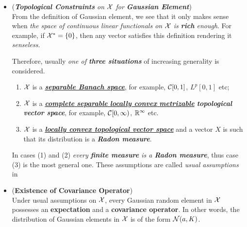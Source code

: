 \documentclass[11pt]{article}
\begin{document}
\begin{itemize}
\item \begin{remark} (\emph{\textbf{Topological Constraints} on ${\mathcal X}$ for \textbf{Gaussian Element}})  \citep{lifshits2012lectures}\\
From the definition of Gaussian element, we see that it only makes sense when \emph{the space of continuous linear functionals on ${\mathcal X}$ is \textbf{rich} enough}. For example, if ${\mathcal X}^*= \left\{0\right\}$, then any vector satisfies this definition rendering it \emph{senseless}. 

Therefore, usually \emph{one of \textbf{three situations}} of increasing generality is considered.
\begin{enumerate}
\item ${\mathcal X}$ is a \underline{\emph{\textbf{separable Banach space}}}, for example, ${\mathcal C}[0, 1]$, $L^p[0, 1]$ etc; 
\item ${\mathcal X}$ is a \emph{\underline{\textbf{complete} \textbf{separable} \textbf{locally convex} \textbf{metrizable}} \textbf{topological vector space}},
for example, ${\mathcal C}[0, \infty)$, ${\mathbb R}^{\infty}$ etc.
\item ${\mathcal X}$ is a \underline{\emph{\textbf{locally convex topological vector space}}} and a vector $X$ is such that its distribution is a \emph{\textbf{Radon measure}}.
\end{enumerate}
In cases (1) and (2) \emph{every \textbf{finite measure} is a \textbf{Radon measure}}, thus case (3) is the most general one. These assumptions are called \emph{usual assumptions} in \citep{lifshits2012lectures, lifshits2013gaussian}
\end{remark}

\item \begin{proposition} (\textbf{Existence of Covariance Operator}) \citep{lifshits2013gaussian}\\
Under usual assumptions on ${\mathcal X}$, every Gaussian random element in ${\mathcal X}$ possesses an \textbf{expectation} and a \textbf{covariance operator}. In other words, the distribution of Gaussian elements in ${\mathcal X}$ is of the form ${\mathcal N}(a, K)$. 
\end{proposition}


\end{itemize}
\end{document}
